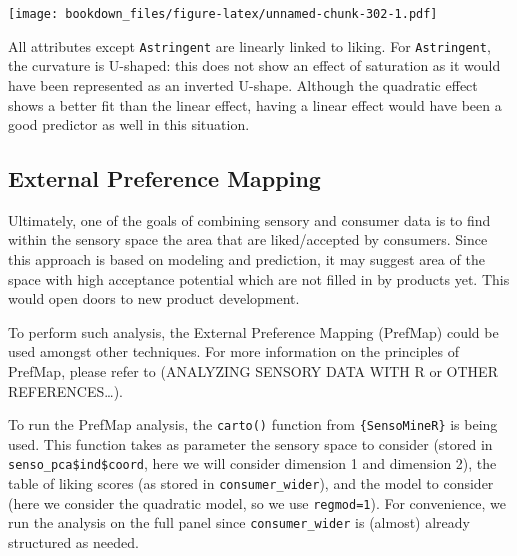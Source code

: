\documentclass[
]{krantz}
\makeatletter
\newenvironment{Shaded}{\begin{snugshade}}{\end{snugshade}}
\newcommand{\AttributeTok}[1]{\textcolor[rgb]{0.61,0.61,0.61}{#1}}
\newcommand{\ConstantTok}[1]{\textcolor[rgb]{0,0,0}{#1}}
\newcommand{\ControlFlowTok}[1]{\textcolor[rgb]{0.27,0.27,0.27}{\textbf{#1}}}
\newcommand{\FunctionTok}[1]{\textcolor[rgb]{0,0,0}{#1}}
\newcommand{\NormalTok}[1]{#1}
\newcommand{\OtherTok}[1]{\textcolor[rgb]{0.37,0.37,0.37}{#1}}
\newcommand{\SpecialCharTok}[1]{\textcolor[rgb]{0,0,0}{#1}}
\newenvironment{kframe}{%
\medskip{}
\setlength{\fboxsep}{.8em}
 \def\at@end@of@kframe{}%
 \ifinner\ifhmode%
  \def\at@end@of@kframe{\end{minipage}}%
  \begin{minipage}{\columnwidth}%
 \fi\fi%
 \def\FrameCommand##1{\hskip\@totalleftmargin \hskip-\fboxsep
 \colorbox{shadecolor}{##1}\hskip-\fboxsep
     \hskip-\linewidth \hskip-\@totalleftmargin \hskip\columnwidth}%
 \MakeFramed {\advance\hsize-\width
   \@totalleftmargin\z@ \linewidth\hsize
   \@setminipage}}%
 {\par\unskip\endMakeFramed%
 \at@end@of@kframe}
\renewenvironment{Shaded}{\begin{kframe}}{\end{kframe}}
\makeatother
\begin{document}
\begin{Shaded}
\end{Shaded}

\texttt{[image: bookdown\_files/figure-latex/unnamed-chunk-302-1.pdf]}

All attributes except \texttt{Astringent} are linearly linked to liking. For \texttt{Astringent}, the curvature is U-shaped: this does not show an effect of saturation as it would have been represented as an inverted U-shape. Although the quadratic effect shows a better fit than the linear effect, having a linear effect would have been a good predictor as well in this situation.

\hypertarget{prefmap}{%
\subsection{External Preference Mapping}\label{prefmap}}

Ultimately, one of the goals of combining sensory and consumer data is to find within the sensory space the area that are liked/accepted by consumers. Since this approach is based on modeling and prediction, it may suggest area of the space with high acceptance potential which are not filled in by products yet. This would open doors to new product development.

To perform such analysis, the External Preference Mapping (PrefMap) could be used amongst other techniques. For more information on the principles of PrefMap, please refer to (ANALYZING SENSORY DATA WITH R or OTHER REFERENCES\ldots).

To run the PrefMap analysis, the \texttt{carto()} function from \texttt{\{SensoMineR\}} is being used. This function takes as parameter the sensory space to consider (stored in \texttt{senso\_pca\$ind\$coord}, here we will consider dimension 1 and dimension 2), the table of liking scores (as stored in \texttt{consumer\_wider}), and the model to consider (here we consider the quadratic model, so we use \texttt{regmod=1}). For convenience, we run the analysis on the full panel since \texttt{consumer\_wider} is (almost) already structured as needed.
\end{document}
